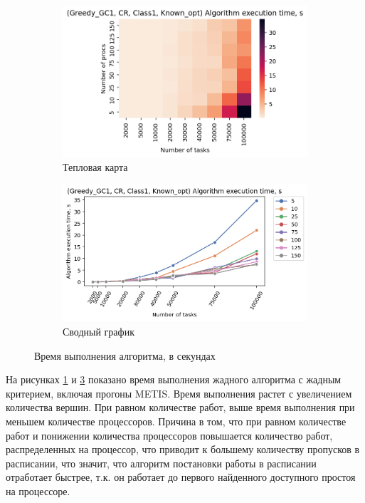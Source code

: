 \begin{figure}[!htbp]
    \centering
    \begin{subfigure}{0.49\textwidth}
        \includegraphics[width=\textwidth]{imgs/ideal_1/CR/et_heatmap.png}
        \caption{Тепловая карта}
        \label{fig:CR-exec-time-heatmap}
    \end{subfigure}
    \hfill
    \begin{subfigure}{0.49\textwidth}
        \includegraphics[width=\textwidth]{imgs/ideal_1/CR/tr_graph.png}
        \caption{Сводный график}
        \label{fig:CR-exec-time-compiled}
    \end{subfigure}
    \caption{Время выполнения алгоритма, в секундах}
\end{figure}

На рисунках \ref{fig:CR-exec-time-heatmap} и \ref{fig:CR-exec-time-compiled} показано время выполнения жадного алгоритма с жадным критерием, включая прогоны METIS. Время выполнения растет с увеличением количества вершин. При равном количестве работ, выше время выполнения при меньшем количестве процессоров. Причина в том, что при равном количестве работ и понижении количества процессоров повышается количество работ, распределенных на процессор, что приводит к большему количеству пропусков в расписании, что значит, что алгоритм постановки работы в расписании отработает быстрее, т.к. он работает до первого найденного доступного простоя на процессоре. 


